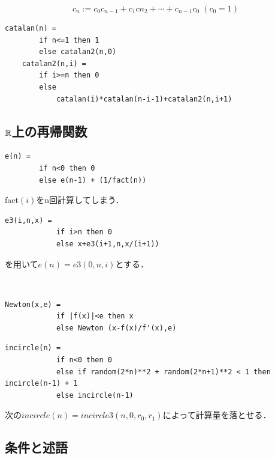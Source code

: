 \documentclass[uplatex, dvipdfmx]{jsreport}
\begin{document}
\begin{example}[catalan数]
    \[ c_n:= c_0c_{n-1} + c_1c{n_2} + \cdots + c_{n-1}c_0\;(c_0=1) \]
    \begin{lstlisting}[caption=catalan number]
    catalan(n) = 
        if n<=1 then 1
        else catalan2(n,0)
    catalan2(n,i) = 
        if i>=n then 0
        else
            catalan(i)*catalan(n-i-1)+catalan2(n,i+1)
    \end{lstlisting}
\end{example}

\subsection{$\mathbb{R}$上の再帰関数}

\begin{example}[指数関数]
    \begin{lstlisting}[caption=exponential]
    e(n) = 
        if n<0 then 0
        else e(n-1) + (1/fact(n))
    \end{lstlisting}
    fact$(i)$をn回計算してしまう．
    \begin{lstlisting}[caption=exponential2]
        e3(i,n,x) = 
            if i>n then 0
            else x+e3(i+1,n,x/(i+1))
    \end{lstlisting}
    を用いて$e(n)=e3(0,n,i)$とする．
\end{example}

\begin{example}[Newton法]　

    \begin{lstlisting}[caption=Newton method]
        Newton(x,e) = 
            if |f(x)|<e then x
            else Newton (x-f(x)/f'(x),e)
    \end{lstlisting}
\end{example}

\begin{example}
    
    \begin{lstlisting}[caption=Monte Carlo method]
        incircle(n) =
            if n<0 then 0
            else if random(2*n)**2 + random(2*n+1)**2 < 1 then incircle(n-1) + 1
            else incircle(n-1)
    \end{lstlisting}
    次の$incircle(n)=incircle3(n,0,r_0,r_1)$によって計算量を落とせる．
\end{example}

\subsection{条件と述語}
\end{document}
